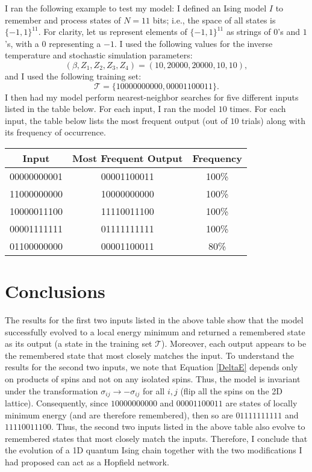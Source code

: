 \documentclass[12pt]{article}
\newcommand{\calT}{\mathcal{T}}
\begin{document}
I ran the following example to test my model: I defined an Ising model $I$ to remember and process states of $N=11$ bits; i.e., the space of all states is $\{-1, 1\}^{11}$. For clarity, let us represent elements of $\{-1,1\}^{11}$ as strings of $0$'s and $1$'s, with a $0$ representing a $-1$. I used the following values for the inverse temperature and stochastic simulation parameters:
\begin{equation}
(\beta,Z_1,Z_2,Z_3,Z_4) = (10,20000,20000,10,10),
\end{equation}
and I used the following training set:
\begin{equation}
\calT = \{10000000000, 00001100011\}.
\end{equation}
I then had my model perform nearest-neighbor searches for five different inputs listed in the table below. For each input, I ran the model $10$ times. For each input, the table below lists the most frequent output (out of $10$ trials) along with its frequency of occurrence.

\begin{center}
\begin{tabular}{|c|c|c|} \hline
Input & Most Frequent Output & Frequency \\ \hline
00000000001 & 00001100011 & 100\% \\ \hline
11000000000 & 10000000000 & 100\% \\ \hline
10000011100 & 11110011100 & 100\% \\ \hline
00001111111 & 01111111111 & 100\% \\ \hline
01100000000 & 00001100011 & 80\% \\ \hline
\end{tabular}
\end{center}

\section{Conclusions}

The results for the first two inputs listed in the above table show that the model successfully evolved to a local energy minimum and returned a remembered state as its output (a state in the training set $\calT$). Moreover, each output appears to be the remembered state that most closely matches the input. To understand the results for the second two inputs, we note that Equation \eqref{DeltaE} depends only on products of spins and not on any isolated spins. Thus, the model is invariant under the transformation $\sigma_{ij}\rightarrow -\sigma_{ij}$ for all $i,j$ (flip all the spins on the 2D lattice). Consequently, since $10000000000$ and $00001100011$ are states of locally minimum energy (and are therefore remembered), then so are $01111111111$ and $11110011100$. Thus, the second two inputs listed in the above table also evolve to remembered states that most closely match the inputs. Therefore, I conclude that the evolution of a 1D quantum Ising chain together with the two modifications I had proposed can act as a Hopfield network.
\end{document}
